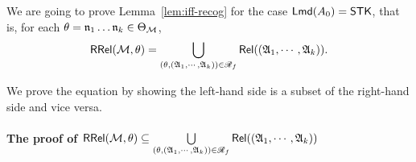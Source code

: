 




We are going to prove Lemma~\ref{lem:iff-recog} for the case ${\sf Lmd}(A_0) = {\sf STK}$, that is, for each $\theta=\mathfrak{n}_1\dots\mathfrak{n}_k\in\Theta_{{\mathcal{M} }}$, 
%
\[\mathsf{RRel}({\mathcal{M} }, \theta) = \bigcup \limits_{(\theta, ({\mathfrak{A} }_1, \cdots, {\mathfrak{A} }_k)) \in \mathscr{R}_f} \mathsf{Rel}(({\mathfrak{A} }_1, \cdots, {\mathfrak{A} }_k)).\]

We prove the equation by showing the left-hand side is a subset of the right-hand side and vice versa. 

\paragraph*{The proof of $\mathsf{RRel}({\mathcal{M} }, \theta) \subseteq \bigcup \limits_{(\theta, ({\mathfrak{A} }_1, \cdots, {\mathfrak{A} }_k)) \in \mathscr{R}_f} \mathsf{Rel}(({\mathfrak{A} }_1, \cdots, {\mathfrak{A} }_k))$}


